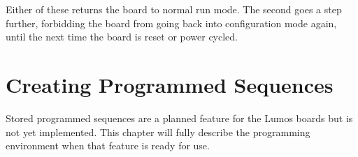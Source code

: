 \documentclass[letterpaper,twoside,onecolumn,openright,final]{memoir}
\begin{document}
Either of these returns the board to normal run mode.  The second goes a step further, forbidding
the board from going back into configuration mode again, until the next time the board is reset or
power cycled.

\chapter{Creating Programmed Sequences}\label{ch:sequences}
\begin{NotImplemented*}{Stored programmed sequences are a planned feature for the Lumos boards but is not
yet implemented.  This chapter will fully describe the programming environment when that feature is
ready for use.}

\end{NotImplemented*}
\end{document}
